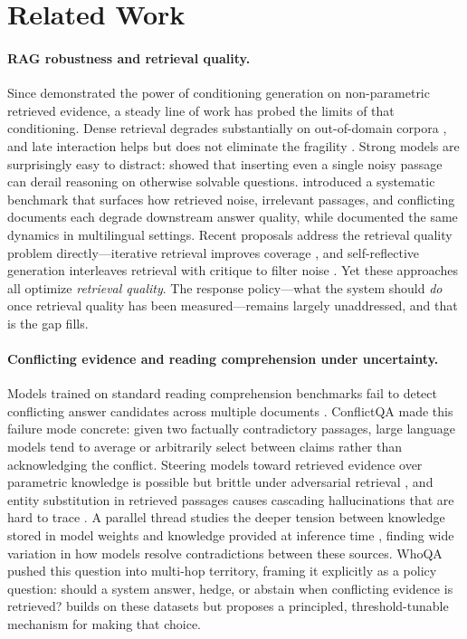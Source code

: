 \section{Related Work}
\label{sec:related}

\paragraph{RAG robustness and retrieval quality.}
Since \citet{lewis2020rag} demonstrated the power of conditioning generation on non-parametric retrieved evidence, a steady line of work has probed the limits of that conditioning. Dense retrieval degrades substantially on out-of-domain corpora \citep{dpr2020}, and late interaction helps but does not eliminate the fragility \citep{colbert2020}. Strong models are surprisingly easy to distract: \citet{shi2023large} showed that inserting even a single noisy passage can derail reasoning on otherwise solvable questions. \citet{retrievalrobust2024} introduced a systematic benchmark that surfaces how retrieved noise, irrelevant passages, and conflicting documents each degrade downstream answer quality, while \citet{nomiracl2024} documented the same dynamics in multilingual settings. Recent proposals address the retrieval quality problem directly---iterative retrieval improves coverage \citep{trivedi2023interleaving}, and self-reflective generation interleaves retrieval with critique to filter noise \citep{asai2024selfrag}. Yet these approaches all optimize \emph{retrieval quality}. The response policy---what the system should \emph{do} once retrieval quality has been measured---remains largely unaddressed, and that is the gap \method{} fills.

\paragraph{Conflicting evidence and reading comprehension under uncertainty.}
Models trained on standard reading comprehension benchmarks fail to detect conflicting answer candidates across multiple documents \citep{chen2022rich}. ConflictQA \citep{conflictqa2023} made this failure mode concrete: given two factually contradictory passages, large language models tend to average or arbitrarily select between claims rather than acknowledging the conflict. Steering models toward retrieved evidence over parametric knowledge is possible but brittle under adversarial retrieval \citep{xie2023adaptive}, and entity substitution in retrieved passages causes cascading hallucinations that are hard to trace \citep{longpre2021entity}. A parallel thread studies the deeper tension between knowledge stored in model weights \citep{petroni2019language} and knowledge provided at inference time \citep{mallen2023trust}, finding wide variation in how models resolve contradictions between these sources. WhoQA \citep{whoqa2025} pushed this question into multi-hop territory, framing it explicitly as a policy question: should a system answer, hedge, or abstain when conflicting evidence is retrieved? \method{} builds on these datasets but proposes a principled, threshold-tunable mechanism for making that choice.

